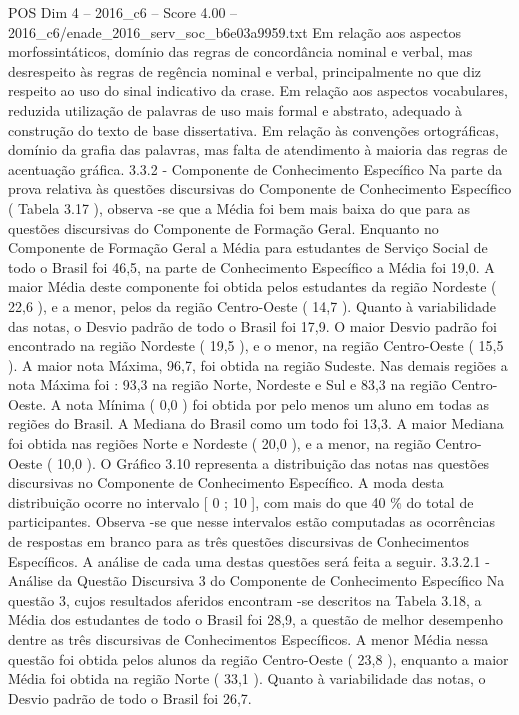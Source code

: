 \begin{textsample}{POS Dim 4 – 2016\_c6 – Score 4.00 – 2016\_c6/enade\_2016\_serv\_soc\_b6e03a9959.txt}
Em relação aos aspectos morfossintáticos, domínio das regras de concordância nominal e verbal, mas desrespeito às regras de regência nominal e verbal, principalmente no que diz respeito ao uso do sinal indicativo da crase.
Em relação aos aspectos vocabulares, reduzida utilização de palavras de uso mais formal e abstrato, adequado à construção do texto de base dissertativa.
Em relação às convenções ortográficas, domínio da grafia das palavras, mas falta de atendimento à maioria das regras de acentuação gráfica. 3.3.2 - Componente de Conhecimento Específico Na parte da prova relativa às questões discursivas do Componente de Conhecimento Específico ( Tabela 3.17 ), observa -se que a Média foi bem mais baixa do que para as questões discursivas do Componente de Formação Geral.
Enquanto no Componente de Formação Geral a Média para estudantes de Serviço Social de todo o Brasil foi 46,5, na parte de Conhecimento Específico a Média foi 19,0.
A maior Média deste componente foi obtida pelos estudantes da região Nordeste ( 22,6 ), e a menor, pelos da região Centro-Oeste ( 14,7 ).
Quanto à variabilidade das notas, o Desvio padrão de todo o Brasil foi 17,9.
O maior Desvio padrão foi encontrado na região Nordeste ( 19,5 ), e o menor, na região Centro-Oeste ( 15,5 ).
A maior nota Máxima, 96,7, foi obtida na região Sudeste.
Nas demais regiões a nota Máxima foi : 93,3 na região Norte, Nordeste e Sul e 83,3 na região Centro-Oeste.
A nota Mínima ( 0,0 ) foi obtida por pelo menos um aluno em todas as regiões do Brasil.
A Mediana do Brasil como um todo foi 13,3.
A maior Mediana foi obtida nas regiões Norte e Nordeste ( 20,0 ), e a menor, na região Centro-Oeste ( 10,0 ).
O Gráfico 3.10 representa a distribuição das notas nas questões discursivas no Componente de Conhecimento Específico.
A moda desta distribuição ocorre no intervalo [ 0 ; 10 ], com mais do que 40 \% do total de participantes.
Observa -se que nesse intervalos estão computadas as ocorrências de respostas em branco para as três questões discursivas de Conhecimentos Específicos.
A análise de cada uma destas questões será feita a seguir. 3.3.2.1 - Análise da Questão Discursiva 3 do Componente de Conhecimento Específico Na questão 3, cujos resultados aferidos encontram -se descritos na Tabela 3.18, a Média dos estudantes de todo o Brasil foi 28,9, a questão de melhor desempenho dentre as três discursivas de Conhecimentos Específicos.
A menor Média nessa questão foi obtida pelos alunos da região Centro-Oeste ( 23,8 ), enquanto a maior Média foi obtida na região Norte ( 33,1 ).
Quanto à variabilidade das notas, o Desvio padrão de todo o Brasil foi 26,7.

\end{textsample}
